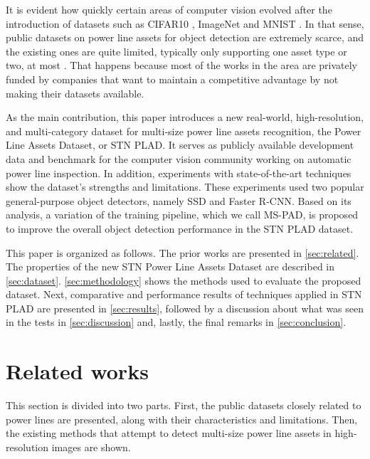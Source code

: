 \documentclass[10pt,conference]{IEEEtran}
\begin{document}
It is evident how quickly certain areas of computer vision evolved after the introduction of datasets such as CIFAR10 \cite{krizhevsky2009learning}, ImageNet \cite{krizhevsky2012imagenet} and MNIST \cite{lecun1998gradient}. In that sense, public datasets on power line assets for object detection are extremely scarce, and the existing ones are quite limited, typically only supporting one asset type or two, at most \cite{tao2018cplid, tomaszewski2018collection, abdelfattah2020ttpla}. That happens because most of the works in the area are privately funded by companies that want to maintain a competitive advantage by not making their datasets available. 

As the main contribution, this paper introduces a new real-world, high-resolution, and multi-category dataset for multi-size power line assets recognition, the Power Line Assets Dataset, or STN PLAD. It serves as publicly available development data and benchmark for the computer vision community working on automatic power line inspection. In addition, experiments with state-of-the-art techniques show the dataset's strengths and limitations. These experiments used two popular general-purpose object detectors, namely SSD and Faster R-CNN. Based on its analysis, a variation of the training pipeline, which we call MS-PAD, is proposed to improve the overall object detection performance in the STN PLAD dataset.





This paper is organized as follows. The prior works are presented in \autoref{sec:related}. The properties of the new STN Power Line Assets Dataset are described in \autoref{sec:dataset}. 
\autoref{sec:methodology} shows the methods used to evaluate the proposed dataset.
Next, comparative and performance results of techniques applied in  STN PLAD are presented in \autoref{sec:results}, followed by a discussion about what was seen in the tests in \autoref{sec:discussion} and, lastly, the final remarks in \autoref{sec:conclusion}.

\section{Related works}
\label{sec:related}

This section is divided into two parts. First, the public datasets closely related to power lines are presented, along with their characteristics and limitations. Then, the existing methods that attempt to detect multi-size power line assets in high-resolution images are shown.
\end{document}
